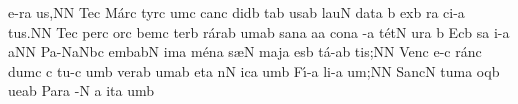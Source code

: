 \sgn {}e{-r}\punctum a\egn
\sgn {}u{s,}\punctum N\augmentum N\egn
\spatium\divisiofinalis\spatium
\sgn Te{}\punctum c\egn
\spatium\sgn M{\'a}r\punctum c\egn
\sgn tyr\punctum c\egn
\sgn {}um\punctum c\egn
\spatium\sgn can\punctum c\egn
\sgn did\punctum b\egn
{}t\pes ab\egn
\sgn {}us\punctum a\augmentum b\egn
\spatium\divisiominor\spatium
\sgn lau\punctum N\egn
\sgn dat\punctum a\egn
\spatium
\custos b
\lineaproxima
\sgn {}ex\engl{}\punctum b\egn
{}r\punctum a\egn
\sgn ci-\punctum a\egn
%
\sgn tu{s.}\punctum N\augmentum N\egn
\spatium\divisiofinalis\spatium
\sgn Te{}\punctum c\egn
\spatium\sgn per\punctum c\egn
\spatium\sgn {}or\punctum c\egn
\sgn bem\punctum c\egn
\spatium\sgn ter\punctum b\egn
\sgn r{\'a}r\pes ab\egn
\sgn {}um\punctum a\augmentum b\egn
\spatium
\divisiominor\spatium
\sgn san\punctum a\egn
{}a{}\punctum a\egn
\spatium\sgn con\punctum a\egn
{}-\punctum a\egn
\sgn t{\'e}t\punctum N\egn
\sgn {}ur\punctum a\egn
\spatium\custos b
\lineaproxima
\sgn {}Ec\engl{}\punctum b\egn
{}s\punctum a\egn
\sgn {}i-\punctum a\egn
\sgn {}a{}\punctum N\augmentum N\egn
\spatium\divisiofinalis
\spatium
\sgn Pa{-}\pes Na\augmentum N\nonspatium\hskip-3pt\quilismapes bc\egn
{}em\clivis ba\augmentumduplex bN\egn
\spatium
\divisiominima
\spatium
\sgn {}im\punctum a\egn
\sgn m{\'e}n\punctum a\egn
\sgn s{\ae}{}\punctum N\egn
\spatium
\sgn maj\punctum a\egn
\sgn {}es\punctum b\egn
\sgn t{\'a}-\punctum a\augmentum b\egn
\sgn ti{s;}\punctum N\augmentum N\egn
\spatium\divisiofinalis\spatium
\sgn Ven\punctum c\egn
\sgn {}e-\punctum c\egn
\sgn r{\'a}n\punctum c\egn
\sgn dum\punctum c\egn
\spatium\custos c
\lineaproxima
\sgn tu-\punctum c\egn
\sgn {}um\punctum b\egn
\spatium
\sgn ver\pes ab\egn
\sgn {}um\punctum a\augmentum b\egn
\spatium
\divisiominor
\spatium
\sgn {}et\punctum a\egn
\spatium
{}n\punctum N\egn
\sgn {}ic\punctum a\egn
\sgn {}um\punctum b\egn
\spatium
\sgn F{\'\i}-\punctum a\egn
\sgn li-\punctum a\egn
\sgn {}u{m;}\punctum N\augmentum N\egn
\spatium
\divisiofinalis
\spatium
\sgn Sa{nc}\punctum N\egn
\sgn tu{m}\engl{}\punctum a\egn
\spatium
{}oq\punctum b\egn
\sgn ue{}\punctum a\augmentum b\egn
\spatium
\divisiominima
\spatium
\sgn Par\punctum a\egn
{}-\punctum N\egn
\custos a
\lineaproxima
{}it\punctum a\egn
\sgn {}um\punctum b\egn
